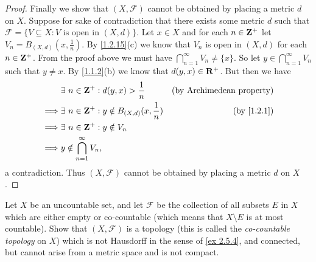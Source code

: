 \begin{proof}
  Finally we show that \((X, \mathcal{F})\) cannot be obtained by placing a metric \(d\) on \(X\).
  Suppose for sake of contradiction that there exists some metric \(d\) such that \(\mathcal{F} = \{V \subseteq X : V \text{ is open in } (X, d)\}\).
  Let \(x \in X\) and for each \(n \in \mathbf{Z}^+\) let \(V_n = B_{(X, d)}(x, \frac{1}{n})\).
  By \cref{1.2.15}(c) we know that \(V_n\) is open in \((X, d)\) for each \(n \in \mathbf{Z}^+\).
  From the proof above we must have \(\bigcap_{n = 1}^\infty V_n \neq \{x\}\).
  So let \(y \in \bigcap_{n = 1}^\infty V_n\) such that \(y \neq x\).
  By \cref{1.1.2}(b) we know that \(d(y, x) \in \mathbf{R}^+\).
  But then we have
  \begin{align*}
             & \exists\ n \in \Z^+ : d(y, x) > \frac{1}{n}               & \text{(by Archimedean property)} \\
    \implies & \exists\ n \in \Z^+ : y \notin B_{(X, d)}(x, \frac{1}{n}) & \text{(by \cref{1.2.1})}         \\
    \implies & \exists\ n \in \Z^+ : y \notin V_n                                                           \\
    \implies & y \notin \bigcap_{n = 1}^\infty V_n,
  \end{align*}
  a contradiction.
  Thus \((X, \mathcal{F})\) cannot be obtained by placing a metric \(d\) on \(X\).
\end{proof}

\begin{exercise}\label{ex 2.5.7}
  Let \(X\) be an uncountable set, and let \(\mathcal{F}\) be the collection of all subsets \(E\) in \(X\) which are either empty or co-countable
  (which means that \(X \setminus E\) is at most countable).
  Show that \((X, \mathcal{F})\) is a topology (this is called the \emph{co-countable topology} on \(X\)) which is not Hausdorff in the sense of \cref{ex 2.5.4}, and connected, but cannot arise from a metric space and is not compact.
\end{exercise}

